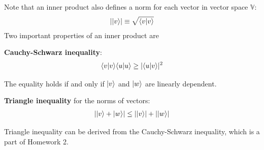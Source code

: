 Note that an inner product also defines a norm for each vector in vector space $\mathbb{V}$:
\begin{align}
||{v}\rangle|\equiv\sqrt{\langle{v|v}\rangle}
\end{align}
Two important properties of an inner product are

\begin{thm}
    \textbf{ Cauchy-Schwarz inequality}:
\begin{align}
\langle{v|v}\rangle\langle{u|u}\rangle\geq|\langle{u|v}\rangle|^2
\end{align}
\end{thm}
The equality holds if and only if $|{v}\rangle$ and $|{w}\rangle$ are linearly dependent.

\begin{thm}
  \textbf{Triangle inequality} for the norms of vectors:
\begin{align}
||{v}\rangle+|{w}\rangle|\leq||{v}\rangle|+||{w}\rangle|
\end{align}  
\end{thm}
Triangle inequality can be derived from the Cauchy-Schwarz inequality, which is a part of Homework 2. 

